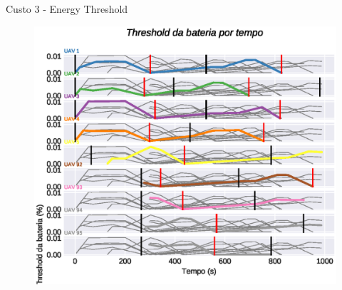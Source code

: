 \begin{frame}{Custo 3 - Energy Threshold}
            \begin{figure}[!htb]
                 \includegraphics[width=\textwidth]{custo_3/uav_energy_threshold_.eps}
             \end{figure}
        \end{frame}